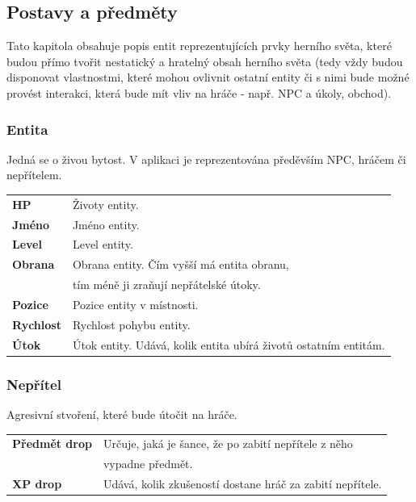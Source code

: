 \documentclass[12pt,a4paper]{article}
\begin{document}
\subsection{Postavy a předměty}
Tato kapitola obsahuje popis entit reprezentujících prvky herního světa, které
budou přímo tvořit nestatický a hratelný obsah herního světa (tedy vždy budou
disponovat vlastnostmi, které mohou ovlivnit ostatní entity či s nimi bude možné
provést interakci, která bude mít vliv na hráče - např. NPC a úkoly, obchod).

\subsubsection{Entita}
Jedná se o živou bytost. V aplikaci je reprezentována předěvším NPC, hráčem či
nepřítelem. \\[5pt]

\begin{tabular*}{0.87\textwidth}{ll}
  \bf HP & Životy entity. \\ [7pt]
  \bf Jméno & Jméno entity. \\ [7pt]
  \bf Level & Level entity. \\ [7pt]
  \bf Obrana & Obrana entity. Čím vyšší má entita obranu,\\
  \bf        & tím méně ji zraňují nepřátelské útoky. \\ [7pt]
  \bf Pozice & Pozice entity v místnosti. \\ [7pt]
  \bf Rychlost & Rychlost pohybu entity. \\ [7pt]
  \bf Útok & Útok entity. Udává, kolik entita ubírá životů ostatním entitám. \\ [7pt]
\end{tabular*}

\subsubsection{Nepřítel}
Agresivní stvoření, které bude útočit na hráče.\\[5pt]

\begin{tabular*}{0.87\textwidth}{ll}
  \bf Předmět drop & Určuje, jaká je šance, že po zabití nepřítele z něho\\
                   & vypadne předmět. \\[7pt]
  \bf XP drop & Udává, kolik zkušeností dostane hráč za zabití nepřítele.\\[7pt]
\end{tabular*}
\end{document}
